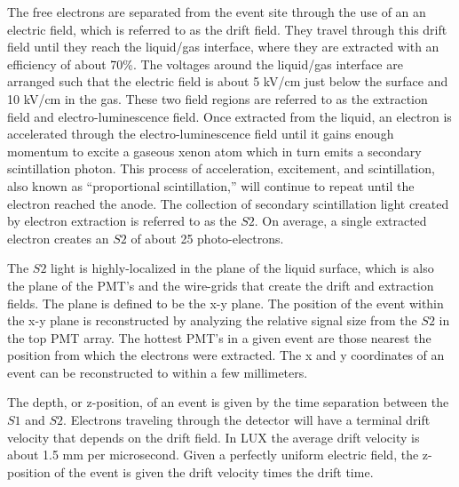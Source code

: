 The free electrons are separated from the event site through the use of an an electric field, which is referred to as the drift field. They travel through this drift field until they reach the liquid/gas interface, where they are extracted with an efficiency of about 70\%. The voltages around the liquid/gas interface are arranged such that the electric field is about 5 kV/cm just below the surface and 10 kV/cm in the gas. These two field regions are referred to as the extraction field and electro-luminescence field. Once extracted from the liquid, an electron is accelerated through the electro-luminescence field until it gains enough momentum to excite a gaseous xenon atom which in turn emits a secondary scintillation photon. This process of acceleration, excitement, and scintillation, also known as ``proportional scintillation,'' will continue to repeat until the electron reached the anode\cite{aprile_doke_LXe,lux2012}. The collection of secondary scintillation light created by electron extraction is referred to as the $S2$. On average, a single extracted electron creates an $S2$ of about 25 photo-electrons.

The $S2$ light is highly-localized in the plane of the liquid surface, which is also the plane of the PMT's and the wire-grids that create the drift and extraction fields. The plane is defined to be the x-y plane. The position of the event within the x-y plane is reconstructed by analyzing the relative signal size from the $S2$ in the top PMT array. The hottest PMT's in a given event are those nearest the position from which the electrons were extracted. The x and y coordinates of an event can be reconstructed to within a few millimeters.

The depth, or z-position, of an event is given by the time separation between the $S1$ and $S2$. Electrons traveling through the detector will have a terminal drift velocity that depends on the drift field. In LUX the average drift velocity is about 1.5 mm per microsecond. Given a perfectly uniform electric field, the z-position of the event is given the drift velocity times the drift time.


